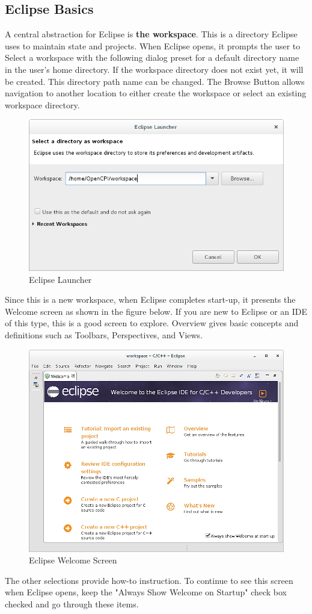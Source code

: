 \documentclass[10pt, a4paper, oneside]{article}
\begin{document}
\newpage
\setcounter{secnumdepth}{1} %
\begin{appendices}
\appendix
\section{Eclipse Basics}
A central abstraction for Eclipse is \textbf{the workspace}. This is a directory Eclipse uses to maintain state and projects. When Eclipse opens, it prompts the user to Select a workspace with the following dialog preset for a default directory name in the user’s home directory. If the workspace directory does not exist yet, it will be created. This directory path name can be changed. The Browse Button allows navigation to another location to either create the workspace or select an existing workspace directory.
 \begin{figure}[h!]
	\centering
	\caption{Eclipse Launcher}{}
	\includegraphics[width=.70\textwidth]{EclipseLauncher.png}
 \end{figure}

Since this is a new workspace, when Eclipse completes start-up, it presents the Welcome screen as shown in the figure below. If you are new to Eclipse or an IDE of this type, this is a good screen to explore. Overview gives basic concepts and definitions such as Toolbars, Perspectives, and Views.
\begin{figure}[h!]
	\centering
	\caption{Eclipse Welcome Screen}{}
	\includegraphics[width=.70\textwidth]{EclipseWelcomeScreen.png}
 \end{figure}
The other selections provide how-to instruction. To continue to see this screen when Eclipse opens, keep the "Always Show Welcome on Startup" check box checked and go through these items. \\


\end{appendices}
\end{document}
